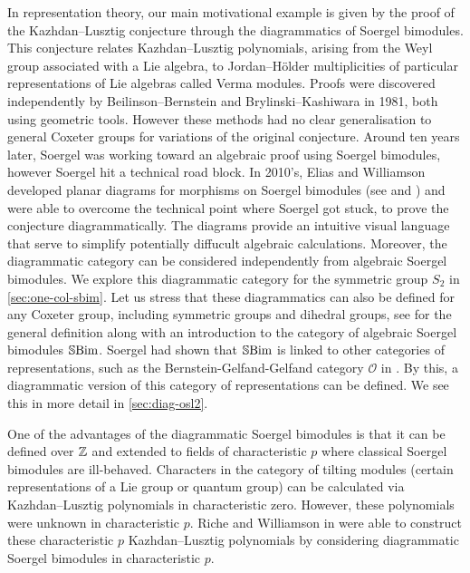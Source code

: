 In representation theory, our main motivational example is given by the proof of the Kazhdan--Lusztig conjecture through the diagrammatics of Soergel bimodules. This conjecture relates Kazhdan--Lusztig polynomials, arising from the Weyl group associated with a Lie algebra, to Jordan--H\"older multiplicities of particular representations of Lie algebras called Verma modules. Proofs were discovered independently by Beilinson--Bernstein and Brylinski--Kashiwara in 1981, both using geometric tools. However these methods had no clear generalisation to general Coxeter groups for variations of the original conjecture. Around ten years later, Soergel was working toward an algebraic proof using Soergel bimodules, however Soergel hit a technical road block. In 2010's, Elias and Williamson developed planar diagrams for morphisms on Soergel bimodules (see \cite{hodge-theory-of-soergel-bimodules} and \cite{diagrammatics-for-soergel-categories}) and were able to overcome the technical point where Soergel got stuck, to prove the conjecture diagrammatically. The diagrams provide an intuitive visual language that serve to simplify potentially diffucult algebraic calculations. Moreover, the diagrammatic category can be considered independently from algebraic Soergel bimodules. We explore this diagrammatic category for the symmetric group $S_2$ in \autoref{sec:one-col-sbim}. Let us stress that these diagrammatics can also be defined for any Coxeter group, including symmetric groups and dihedral groups, see \cite{intro-soergel-bimodules} for the general definition along with an introduction to the category of algebraic Soergel bimodules $\operatorname{\mathbb{S}Bim}$. Soergel had shown that $\operatorname{\mathbb{S}Bim}$ is linked to other categories of representations, such as the Bernstein-Gelfand-Gelfand category $\mathcal{O}$ in \cite{soergel-category-O}. By this, a diagrammatic version of this category of representations can be defined. We see this in more detail in \autoref{sec:diag-osl2}.

One of the advantages of the diagrammatic Soergel bimodules is that it can be defined over $\mathbb{Z}$ and extended to fields of characteristic $p$ where classical Soergel bimodules are ill-behaved. Characters in the category of tilting modules (certain representations of a Lie group or quantum group) can be calculated via Kazhdan--Lusztig polynomials in characteristic zero. However, these polynomials were unknown in characteristic $p$. Riche and Williamson in \cite{riche-williamson-tilt-modules-p-canon-basis} were able to construct these characteristic $p$ Kazhdan--Lusztig polynomials by considering diagrammatic Soergel bimodules in characteristic $p$.

